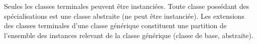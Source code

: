  Seules les classes terminales peuvent être instanciées. Toute classe possédant des spécialisations est une classe abstraite (ne peut être instanciée). Les extensions des classes terminales d'une classe générique constituent une partition de l'ensemble des instances relevant de la classe générique (classe de base, abstraite).
